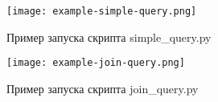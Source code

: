 \begin{figure}[h]
  \centering
  \texttt{[image: example-simple-query.png]}
  \caption{Пример запуска скрипта simple_query.py}
  \label{img:example_simple_query}
\end{figure}

\begin{figure}[h]
  \centering
  \texttt{[image: example-join-query.png]}
  \caption{Пример запуска скрипта join_query.py}
  \label{img:example_join_query}
\end{figure}
